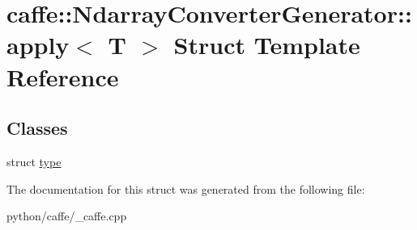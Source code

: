 \hypertarget{structcaffe_1_1_ndarray_converter_generator_1_1apply}{}\section{caffe\+:\+:Ndarray\+Converter\+Generator\+:\+:apply$<$ T $>$ Struct Template Reference}
\label{structcaffe_1_1_ndarray_converter_generator_1_1apply}
\subsection*{Classes}
\begin{DoxyCompactItemize}
\item 
struct \mbox{\hyperlink{structcaffe_1_1_ndarray_converter_generator_1_1apply_3_01_dtype_01_5_01_4_1_1type}{type}}
\end{DoxyCompactItemize}


The documentation for this struct was generated from the following file\+:\begin{DoxyCompactItemize}
\item 
python/caffe/\+\_\+caffe.\+cpp\end{DoxyCompactItemize}
